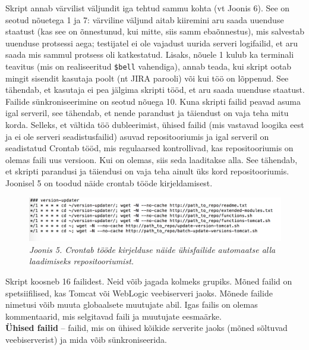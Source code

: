 \documentclass[12pt]{report}
\newcommand{\code}[1]{\texttt{#1}}
\begin{document}
   Skript annab värvilist väljundit iga tehtud sammu kohta (vt Joonis 6). See on seotud nõuetega 1 ja 7: värviline väljund aitab kiiremini aru saada uuenduse staatust (kas see on õnnestunud, kui mitte, siis samm ebaõnnestus), mis salvestab uuenduse protsessi aega; testijatel ei ole vajadust uurida serveri logifailid, et aru saada mis sammul protsess oli katkestatud. Lisaks, nõuele 1 kulub ka terminali teavitus (mis on realiseeritud \code{\$bell} vahendiga), annab teada, kui skript ootab mingit sisendit kasutaja poolt (nt JIRA parooli) või kui töö on lõppenud. See tähendab, et kasutaja ei pea jälgima skripti tööd, et aru saada uuenduse staatust.\\
   
   Failide sünkroniseerimine on seotud nõuega 10. Kuna skripti failid peavad asuma igal serveril, see tähendab, et nende parandust ja täiendust on vaja teha mitu korda. Selleks, et vältida töö dubleerimist, ühised failid (mis vastavad loogika eest ja ei ole serveri seadistusfailid) asuvad repositooriumis ja igal serveril on seadistatud Crontab \cite{cron} tööd, mis regulaarsed kontrollivad, kas repositooriumis on olemas faili uus versioon. Kui on olemas, siis seda laaditakse alla. See tähendab, et skripti parandusi ja täiendusi on vaja teha ainult üks kord repositooriumis. Joonisel 5 on toodud näide crontab tööde kirjeldamisest.
   \begin{figure}[H]
     \begin{center} 
       \includegraphics[width=.75\textwidth]{screenshots/crontab.png}
       \caption*{\textit{Joonis 5. Crontab tööde kirjelduse näide ühisfailide automaatse alla laadimiseks repositooriumist.}}
     \end{center}
   \end{figure}
  
  Skript koosneb 16 failidest. Neid võib jagada kolmeks grupiks. Mõned failid on spetsiifilised, kas Tomcat või WebLogic veebiserveri jaoks. Mõnede failide nimetusi võib muuta globaalsete muutujate abil. Igas failis on olemas kommentaarid, mis selgitavad faili ja muutujate eesmaärke.\\

  \textbf{Ühised failid} \--- failid, mis on ühised kõikide serverite jaoks (mõned sõltuvad veebiserverist) ja mida võib sünkroniseerida.
  
\end{document}
